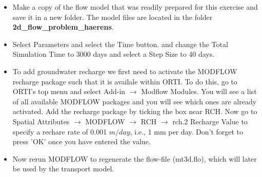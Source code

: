 \begin{itemize}

\item Make a copy of the flow model that was readily prepared for this exercise
and save it in a new folder.
The model files are located in the 
folder {\color{red} \textbf{2d\_flow\_problem\_haerens}}.

\item Select {\color{blue}Parameters} and select the {\color{blue}Time} button.
and change the {\color{blue}Total Simulation Time} to 3000 days and select 
a {\color{blue}Step Size} to 40 days. 

\item To add groundwater recharge we first need to activate the 
MODFLOW recharge package such that it is availale within ORTI.
To do this, go to ORTI's top menu and select {\color{blue}Add-in} 
$\rightarrow$ {\color{blue}Modflow Modules}. You will see a list of 
all available MODFLOW packages and you will see which ones are already activated.
Add the recharge package by ticking the box near {\color{blue}RCH}.
Now go to {\color{blue}Spatial Attributes} $\rightarrow$ {\color{blue}MODFLOW} $\rightarrow$ {\color{blue}RCH} $\rightarrow$ {\color{blue}rch.2 Recharge Value} to specify a rechare rate 
of 0.001 $m/day$, i.e., 1 mm per day. Don't forget to press {\color{blue}'OK'} 
once you have entered the value.   

\item Now rerun MODFLOW to regenerate the flow-file (mt3d.flo), which will later be used 
by the transport model.

\end{itemize}


